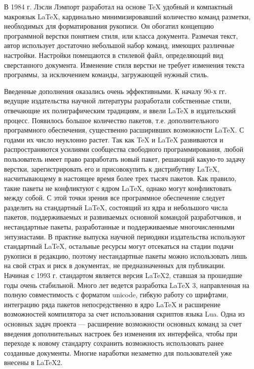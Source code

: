 \documentclass[a4paper, 14pt]{extarticle}
\newcommand{\n}{\par}
\begin{document}
	В 1984 г. Лэсли Лэмпорт разработал на основе \TeX{} удобный и компактный макроязык \LaTeX{}, кардинально минимизировавший количество команд разметки, необходимых для форматирования рукописи. Он обогатил концепцию программной верстки понятием стиля, или класса документа. Размечая текст, автор использует достаточно небольшой набор команд, имеющих различные настройки. Настройки помещаются в стилевой файл, определяющий вид сверстанного документа. Изменение стиля верстки не требует изменения текста программы, за исключением команды, загружающей нужный стиль.\n 
	
	Введенные дополнения оказались очень эффективными. К началу 90-х гг. ведущие издательства научной литературы разработали собственные стили, отвечающие их полиграфическим традициям, и ввели \LaTeX{} в издательский процесс. Появилось большое количество пакетов, т.е. дополнительного программного обеспечения, существенно расширивших возможности \LaTeX{}. С годами их число неуклонно растет. Так как \TeX{} и \LaTeX{} развиваются и распространяются усилиями сообщества свободного программирования, любой пользователь имеет право разработать новый пакет, решающий какую-то задачу верстки, зарегистрировать его и присовокупить к дистрибутиву \LaTeX{}, насчитывающему в настоящее время более трех тысяч пакетов. Как правило, такие пакеты не конфликтуют с ядром \LaTeX{}, однако могут конфликтовать между собой. С этой точки зрения все программное обеспечение следует разделить на стандартный \LaTeX{}, состоящий из ядра и небольшого числа пакетов, поддерживаемых и развиваемых основной командой разработчиков, и нестандартные пакеты, разработанные и поддерживаемые многочисленными энтузиастами. В практике выпуска научной периодики издательства используют стандартный \LaTeX{}, остальные ресурсы могут отсекаться на стадии подачи рукописи в редакцию, поэтому нестандартные пакеты можно использовать лишь на свой страх и риск в документах, не предназначенных для публикации. Начиная с 1993 г. стандартом является версия \LaTeX{}2, ставшая за прошедшие годы очень стабильной. Много лет ведется разработка \LaTeX{} 3, направленная на полную совместимость с форматом unicode, гибкую работу со шрифтами, интеграцию ряда пакетов непосредственно в ядро \LaTeX{} и расширение возможностей компилятора за счет использования скриптов языка Lua. Одна из основных задач проекта — расширение возможности основных команд за счет введения дополнительных настроек без изменения их интерфейса, чтобы при переходе к новому стандарту сохранить возможность использовать ранее созданные документы. Многие наработки незаметно для пользователей уже внесены в \LaTeX{}2.\n
	
\end{document}
